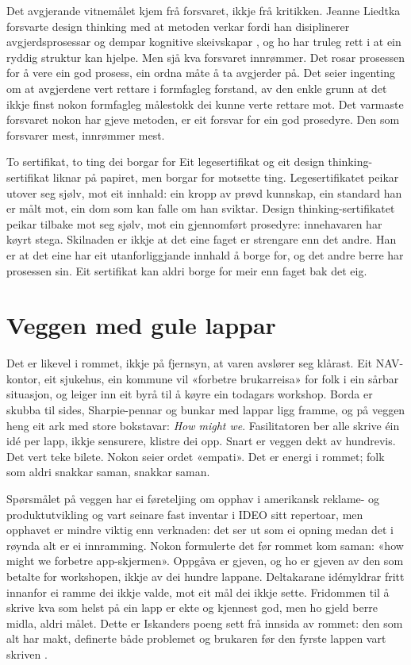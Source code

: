 Det avgjerande vitnemålet kjem frå forsvaret, ikkje frå kritikken. Jeanne Liedtka forsvarte design thinking med at metoden verkar fordi han disiplinerer avgjerdsprosessar og dempar kognitive skeivskapar \autocite{liedtka2018}, og ho har truleg rett i at ein ryddig struktur kan hjelpe. Men sjå kva forsvaret innrømmer. Det rosar prosessen for å vere ein god prosess, ein ordna måte å ta avgjerder på. Det seier ingenting om at avgjerdene vert rettare i formfagleg forstand, av den enkle grunn at det ikkje finst nokon formfagleg målestokk dei kunne verte rettare mot. Det varmaste forsvaret nokon har gjeve metoden, er eit forsvar for ein god prosedyre. Den som forsvarer mest, innrømmer mest.

\begin{kasus}{To sertifikat, to ting dei borgar for}
Eit legesertifikat og eit design thinking-sertifikat liknar på papiret, men borgar for motsette ting. Legesertifikatet peikar utover seg sjølv, mot eit innhald: ein kropp av prøvd kunnskap, ein standard han er målt mot, ein dom som kan falle om han sviktar. Design thinking-sertifikatet peikar tilbake mot seg sjølv, mot ein gjennomført prosedyre: innehavaren har køyrt stega. Skilnaden er ikkje at det eine faget er strengare enn det andre. Han er at det eine har eit utanforliggjande innhald å borge for, og det andre berre har prosessen sin. Eit sertifikat kan aldri borge for meir enn faget bak det eig.
\end{kasus}

\section{Veggen med gule lappar}

Det er likevel i rommet, ikkje på fjernsyn, at varen avslører seg klårast. Eit NAV-kontor, eit sjukehus, ein kommune vil «forbetre brukarreisa» for folk i ein sårbar situasjon, og leiger inn eit byrå til å køyre ein todagars workshop. Borda er skubba til sides, Sharpie-pennar og bunkar med lappar ligg framme, og på veggen heng eit ark med store bokstavar: \emph{How might we}. Fasilitatoren ber alle skrive éin idé per lapp, ikkje sensurere, klistre dei opp. Snart er veggen dekt av hundrevis. Det vert teke bilete. Nokon seier ordet «empati». Det er energi i rommet; folk som aldri snakkar saman, snakkar saman.

Spørsmålet på veggen har ei føreteljing om opphav i amerikansk reklame- og produktutvikling og vart seinare fast inventar i IDEO sitt repertoar, men opphavet er mindre viktig enn verknaden: det ser ut som ei opning medan det i røynda alt er ei innramming. Nokon formulerte det før rommet kom saman: «how might we forbetre app-skjermen». Oppgåva er gjeven, og ho er gjeven av den som betalte for workshopen, ikkje av dei hundre lappane. Deltakarane idémyldrar fritt innanfor ei ramme dei ikkje valde, mot eit mål dei ikkje sette. Fridommen til å skrive kva som helst på ein lapp er ekte og kjennest god, men ho gjeld berre midla, aldri målet. Dette er Iskanders poeng sett frå innsida av rommet: den som alt har makt, definerte både problemet og brukaren før den fyrste lappen vart skriven \autocite{iskander2018}.

